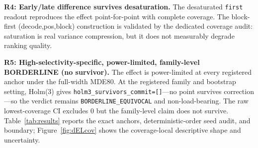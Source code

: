 \documentclass{article}
\begin{document}
\textbf{R4: Early/late difference survives desaturation.} The desaturated \texttt{first}
readout reproduces the effect point-for-point with complete coverage. The block-first
(decode,pos,block) construction is validated by the dedicated coverage audit: saturation is
real variance compression, but it does not measurably degrade ranking quality.

\textbf{R5: High-selectivity-specific, power-limited, family-level BORDERLINE (no survivor).}
The effect is power-limited at every registered anchor under the full-width MDE80. At the
registered family and bootstrap setting, Holm(3) gives
\texttt{holm3\_survivors\_commit=[]}---no point survives correction---so the verdict
remains \texttt{BORDERLINE\_EQUIVOCAL} and non-load-bearing. The raw lowest-coverage CI
excludes 0 but the family-level claim does not survive. Table~\ref{tab:results} reports the
exact anchors, deterministic-order seed audit, and boundary; Figure~\ref{fig:dELcov} shows
the coverage-local descriptive shape and uncertainty.
\end{document}
